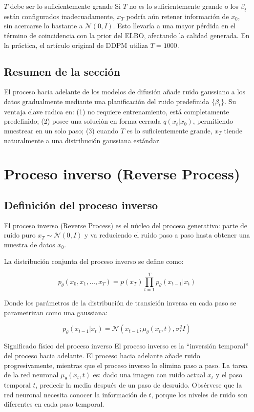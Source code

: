 \documentclass[a4paper]{article}
\begin{document}
\begin{warningbox}{$T$ debe ser lo suficientemente grande}
Si $T$ no es lo suficientemente grande o los $\beta_t$ están configurados inadecuadamente, $x_T$ podría aún retener información de $x_0$, sin acercarse lo bastante a $\mathcal{N}(0, I)$. Esto llevaría a una mayor pérdida en el término de coincidencia con la prior del ELBO, afectando la calidad generada. En la práctica, el artículo original de DDPM utiliza $T = 1000$.
\end{warningbox}

\subsection{Resumen de la sección}

El proceso hacia adelante de los modelos de difusión añade ruido gaussiano a los datos gradualmente mediante una planificación del ruido predefinida $\{\beta_t\}$. Su ventaja clave radica en: (1) no requiere entrenamiento, está completamente predefinido; (2) posee una solución en forma cerrada $q(x_t|x_0)$, permitiendo muestrear en un solo paso; (3) cuando $T$ es lo suficientemente grande, $x_T$ tiende naturalmente a una distribución gaussiana estándar.
\section{Proceso inverso (Reverse Process)}

\subsection{Definición del proceso inverso}

El proceso inverso (Reverse Process) es el núcleo del proceso generativo: parte de ruido puro $x_T \sim \mathcal{N}(0, I)$ y va reduciendo el ruido paso a paso hasta obtener una muestra de datos $x_0$.

La distribución conjunta del proceso inverso se define como:

$$p_\theta(x_0, x_1, \ldots, x_T) = p(x_T) \prod_{t=1}^{T} p_\theta(x_{t-1} | x_t)$$

Donde los parámetros de la distribución de transición inversa en cada paso se parametrizan como una gaussiana:

$$p_\theta(x_{t-1} | x_t) = \mathcal{N}(x_{t-1}; \mu_\theta(x_t, t), \sigma_t^2 I)$$

\begin{importantbox}{Significado físico del proceso inverso}
El proceso inverso es la ``inversión temporal'' del proceso hacia adelante. El proceso hacia adelante añade ruido progresivamente, mientras que el proceso inverso lo elimina paso a paso. La tarea de la red neuronal $\mu_\theta(x_t, t)$ es: dado una imagen con ruido actual $x_t$ y el paso temporal $t$, predecir la media después de un paso de desruido. Obsérvese que la red neuronal necesita conocer la información de $t$, porque los niveles de ruido son diferentes en cada paso temporal.
\end{importantbox}
\end{document}
